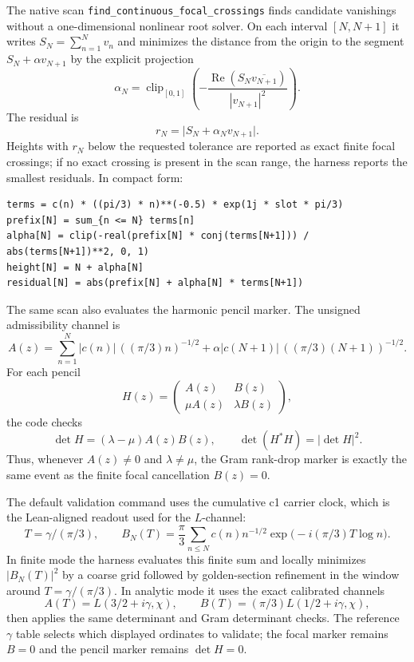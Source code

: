 \documentclass[11pt]{article}
\DeclareMathOperator{\Ree}{Re}
\newcommand{\code}[1]{\texttt{#1}}
\begin{document}
The native scan \code{find\_continuous\_focal\_crossings} finds candidate vanishings without a
one-dimensional nonlinear root solver.  On each interval $[N,N+1]$ it writes
$S_N=\sum_{n=1}^{N}v_n$ and minimizes the distance from the origin to the segment
$S_N+\alpha v_{N+1}$ by the explicit projection
\[
  \alpha_N=\operatorname{clip}_{[0,1]}
    \left(-\frac{\Ree(S_N\overline{v_{N+1}})}{|v_{N+1}|^2}\right).
\]
The residual is
\[
  r_N=\bigl|S_N+\alpha_Nv_{N+1}\bigr|.
\]
Heights with $r_N$ below the requested tolerance are reported as exact finite focal crossings; if no
exact crossing is present in the scan range, the harness reports the smallest residuals.  In compact
form:
\begin{verbatim}
terms = c(n) * ((pi/3) * n)**(-0.5) * exp(1j * slot * pi/3)
prefix[N] = sum_{n <= N} terms[n]
alpha[N] = clip(-real(prefix[N] * conj(terms[N+1])) / abs(terms[N+1])**2, 0, 1)
height[N] = N + alpha[N]
residual[N] = abs(prefix[N] + alpha[N] * terms[N+1])
\end{verbatim}

The same scan also evaluates the harmonic pencil marker.  The unsigned admissibility channel is
\[
  A(z)=\sum_{n=1}^{N}|c(n)|\,((\pi/3)n)^{-1/2}
       +\alpha |c(N+1)|\,((\pi/3)(N+1))^{-1/2}.
\]
For each pencil
\[
  H(z)=
  \begin{pmatrix}
    A(z) & B(z)\\
    \mu A(z) & \lambda B(z)
  \end{pmatrix},
\]
the code checks
\[
  \det H=(\lambda-\mu)A(z)B(z),\qquad
  \det(H^*H)=|\det H|^2.
\]
Thus, whenever $A(z)\ne0$ and $\lambda\ne\mu$, the Gram rank-drop marker is exactly the same event as
the finite focal cancellation $B(z)=0$.

The default validation command uses the cumulative c1 carrier clock, which is the Lean-aligned
readout used for the $L$-channel:
\[
  T=\gamma/(\pi/3),\qquad
  B_N(T)=\frac{\pi}{3}\sum_{n\le N}c(n)n^{-1/2}
    \exp\!\bigl(-i(\pi/3)T\log n\bigr).
\]
In finite mode the harness evaluates this finite sum and locally minimizes $|B_N(T)|^2$ by a coarse
grid followed by golden-section refinement in the window around $T=\gamma/(\pi/3)$.  In analytic mode
it uses the exact calibrated channels
\[
  A(T)=L(3/2+i\gamma,\chi),\qquad
  B(T)=(\pi/3)L(1/2+i\gamma,\chi),
\]
then applies the same determinant and Gram determinant checks.  The reference $\gamma$ table selects
which displayed ordinates to validate; the focal marker remains $B=0$ and the pencil marker remains
\(\det H=0\).
\end{document}
